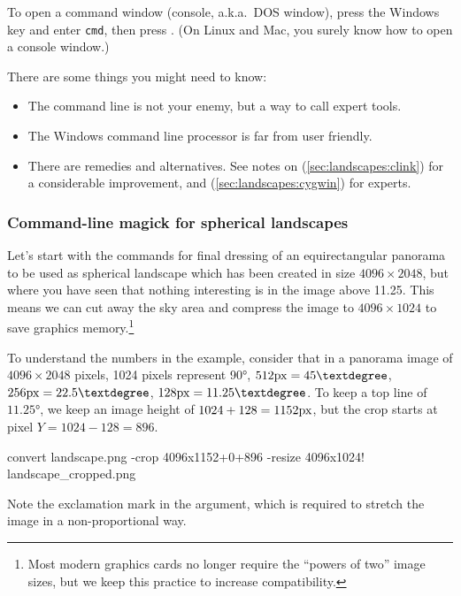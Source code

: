 To open a command window (console, a.k.a.\ DOS window), press the
Windows key and enter \texttt{cmd}, then press \key{\return}. (On Linux and Mac, you
surely know how to open a console window.)

There are some  things you might need to know:
\begin{itemize}
\item The command line is not your enemy, but a way to call expert tools.
\item The Windows command line processor  is far from user friendly.
\item There are remedies and alternatives. See notes on  (\ref{sec:landscapes:clink})
  for a considerable improvement, and  (\ref{sec:landscapes:cygwin}) for experts.
\end{itemize}



\subsubsection{Command-line magick for spherical landscapes}
\label{sec:landscapes:ImageMagic:spherical}

Let's start with the commands for final dressing of an equirectangular
panorama to be used as spherical landscape which has been created in
size $4096\times2048$, but where you have seen that nothing interesting
is in the image above 11.25\degree. This means we can cut away the sky area
and compress the image to $4096\times1024$ to save graphics memory.\footnote{Most
modern graphics cards no longer require the ``powers of two''
image sizes, but we keep this practice to increase compatibility.}

To understand the numbers in the example, consider that in a panorama
image of $4096\times2048$ pixels, 1024 pixels represent 90°,
$512\px=45°$, $256\px=22.5°$, $128\px=11.25°$. To keep a top
line of $11.25°$, we keep an image height of $1024+128=1152\mathrm{px}$, but the crop starts at pixel $Y=1024-128=896$.

\begin{commands}
convert landscape.png -crop 4096x1152+0+896
        -resize 4096x1024! landscape_cropped.png
\end{commands}
%
Note the exclamation mark in the  argument, which is required to
stretch the image in a non-proportional way.

